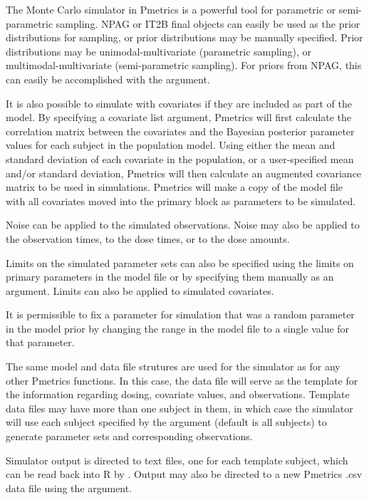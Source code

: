 \documentclass[a4paper]{book}
\begin{document}
\begin{Details}\relax
The Monte Carlo simulator in Pmetrics is a powerful tool for parametric or semi-parametric
sampling.  NPAG or IT2B final objects can easily be used as the prior distributions for 
sampling, or prior distributions may be manually specified.  Prior distributions may be
unimodal-multivariate (parametric sampling), or multimodal-multivariate (semi-parametric sampling).
For priors from NPAG, this can easily be accomplished with the  argument. 

It is also possible to simulate with covariates if they are included as part of the model.
By specifying a covariate list argument, Pmetrics will first calculate the correlation matrix
between the covariates and the Bayesian posterior parameter values for each subject in the population
model.  Using either the mean and standard deviation of each covariate in the population, 
or a user-specified mean and/or standard deviation, Pmetrics will then calculate an augmented 
covariance matrix to be used in simulations.  Pmetrics will make a copy of the model file with all
covariates moved into the primary block as parameters to be simulated.  

Noise can be applied to the simulated observations. Noise may also be applied to
the observation times, to the dose times, or to the dose amounts.  

Limits on the simulated parameter sets can also be specified using the limits on primary parameters in 
the model file or by specifying them manually as an argument. Limits can also be applied to simulated 
covariates. 

It is permissible to fix a parameter for simulation that was a random parameter in the model prior by 
changing the range in the model file to a single value for that parameter.

The same model and data file strutures are used for the simulator as for any other
Pmetrics functions.  In this case, the data file will serve as the template for the information 
regarding dosing, covariate values, and observations.  Template data files may have more than one
subject in them, in which case the simulator will use each subject specified by the 
argument (default is all subjects) to generate  parameter sets and corresponding
observations.  

Simulator output is directed to text files, one for each template subject, which can be 
read back into R by .  Output may also be directed to a new Pmetrics
.csv data file using the  argument.
\end{Details}
\end{document}
